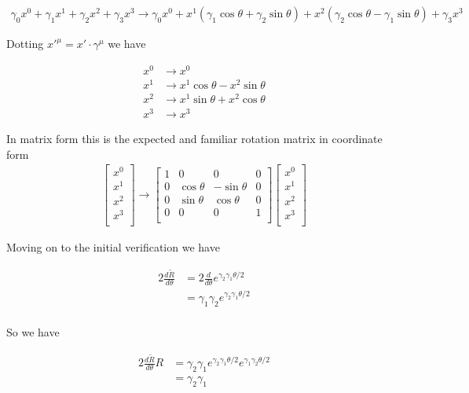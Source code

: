 \begin{align*}
\gamma_0 x^0
+ \gamma_1 x^1
+ \gamma_2 x^2
+ \gamma_3 x^3 
\rightarrow
\gamma_0 x^0
+x^1 (\gamma_1 \cos\theta + \gamma_2 \sin\theta)
+x^2 (\gamma_2 \cos\theta - \gamma_1 \sin\theta)
+\gamma_3 x^3
\end{align*}

Dotting ${x'}^\mu = x' \cdot \gamma^\mu$ we have

\begin{align*}
x^0 &\rightarrow x^0 \\
x^1 &\rightarrow x^1 \cos\theta - x^2 \sin\theta \\
x^2 &\rightarrow x^1 \sin\theta +x^2 \cos\theta  \\
x^3 &\rightarrow x^3
\end{align*}

In matrix form this is the expected and familiar rotation matrix in coordinate form
\begin{align*}
\begin{bmatrix}
x^0 \\
x^1 \\
x^2 \\
x^3 \\
\end{bmatrix}
\rightarrow
\begin{bmatrix}
1 & 0 & 0 & 0 \\
0 & \cos\theta & -\sin\theta & 0 \\
0 & \sin\theta & \cos\theta & 0 \\
0 & 0 & 0 & 1 \\
\end{bmatrix}
\begin{bmatrix}
x^0 \\
x^1 \\
x^2 \\
x^3 \\
\end{bmatrix}
\end{align*}

Moving on to the initial verification we have

\begin{align*}
2 \frac{d\tilde{R}}{d\theta} 
&= 2\frac{d}{d\theta} e^{\gamma_2\gamma_1 \theta/2} \\
&= \gamma_1 \gamma_2 e^{\gamma_2\gamma_1 \theta/2} \\
\end{align*}

So we have

\begin{align*}
2 \frac{d\tilde{R}}{d\theta} R 
&= \gamma_2 \gamma_1 e^{\gamma_2\gamma_1 \theta/2} e^{\gamma_1\gamma_2 \theta/2} \\
&= \gamma_2 \gamma_1 
\end{align*}


